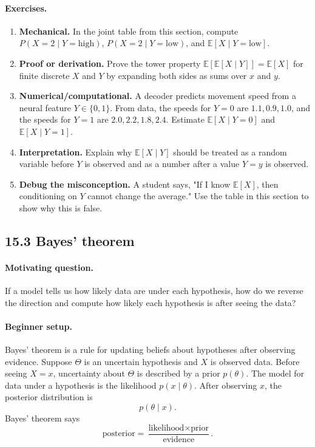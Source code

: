 \paragraph{Exercises.}
\begin{enumerate}[label=\textbf{15.2.\arabic*.}, leftmargin=*]
\item \textbf{Mechanical.} In the joint table from this section, compute \(P(X=2\mid Y=\mathrm{high})\), \(P(X=2\mid Y=\mathrm{low})\), and \(\mathbb{E}[X\mid Y=\mathrm{low}]\).
\item \textbf{Proof or derivation.} Prove the tower property \(\mathbb{E}[\mathbb{E}[X\mid Y]]=\mathbb{E}[X]\) for finite discrete \(X\) and \(Y\) by expanding both sides as sums over \(x\) and \(y\).
\item \textbf{Numerical/computational.} A decoder predicts movement speed from a neural feature \(Y\in\{0,1\}\). From data, the speeds for \(Y=0\) are \(1.1,0.9,1.0\), and the speeds for \(Y=1\) are \(2.0,2.2,1.8,2.4\). Estimate \(\mathbb{E}[X\mid Y=0]\) and \(\mathbb{E}[X\mid Y=1]\).
\item \textbf{Interpretation.} Explain why \(\mathbb{E}[X\mid Y]\) should be treated as a random variable before \(Y\) is observed and as a number after a value \(Y=y\) is observed.
\item \textbf{Debug the misconception.} A student says, "If I know \(\mathbb{E}[X]\), then conditioning on \(Y\) cannot change the average." Use the table in this section to show why this is false.
\end{enumerate}

\subsection{15.3 Bayes' theorem}

\paragraph{Motivating question.}
If a model tells us how likely data are under each hypothesis, how do we reverse the direction and compute how likely each hypothesis is after seeing the data?

\paragraph{Beginner setup.}
Bayes' theorem is a rule for updating beliefs about hypotheses after observing evidence. Suppose \(\Theta\) is an uncertain hypothesis and \(X\) is observed data. Before seeing \(X=x\), uncertainty about \(\Theta\) is described by a prior \(p(\theta)\). The model for data under a hypothesis is the likelihood \(p(x\mid \theta)\). After observing \(x\), the posterior distribution is
\[
p(\theta\mid x).
\]
Bayes' theorem says
\[
\text{posterior}
=
\frac{\text{likelihood}\times\text{prior}}{\text{evidence}}.
\]


